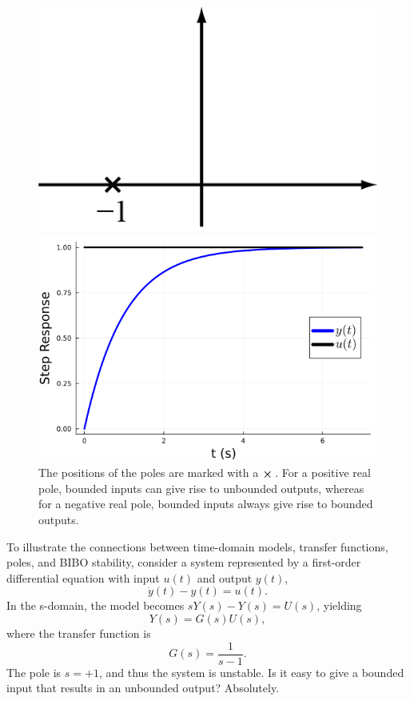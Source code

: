 \begin{figure}[hbt]
		
\begin{minipage}[h]{.46\linewidth}
   \centering
   \includegraphics[width=0.8\linewidth]{graphics/Chap10/StableRealPole.png}
\end{minipage}\hfill
\begin{minipage}[h]{.46\linewidth}
   \centering
  \includegraphics[width=0.8\linewidth]{graphics/Chap10/StepStableFirstOrder.png}
\end{minipage}

\caption{The positions of the poles are marked with a ${\mathlarger{ \bm{\times}}}\, $. For a positive real pole, bounded inputs can give rise to unbounded outputs, whereas for a negative real pole, bounded inputs always give rise to bounded outputs.}
	\label{fig:FiguresPolesZerosBIBO:StepResponseWithRealPole}
\end{figure}

\vspace*{.2cm}

To illustrate the connections between time-domain models, transfer functions, poles, and BIBO stability, consider a system represented by a first-order differential equation with input $u(t)$ and output $y(t)$,
$$ \dot{y}(t) - y(t) = u(t).$$
In the s-domain, the model becomes $s Y(s) - Y(s) = U(s)$, yielding
$$Y(s) = G(s) U(s),$$
where the transfer function is
$$G(s) = \frac{1}{s-1}.$$
The pole is $s=+1$, and thus the system is unstable. Is it easy to give a bounded input that results in an unbounded output? Absolutely.\\

